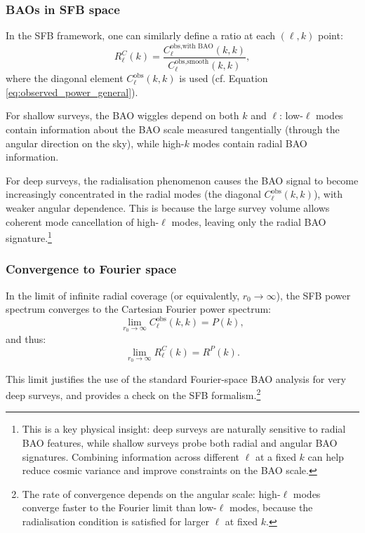 \subsubsection{BAOs in SFB space}

In the SFB framework, one can similarly define a ratio at each $(\ell,k)$ point:
\begin{equation}
R^C_\ell(k) = \frac{C^{\text{obs,with BAO}}_\ell(k,k)}{C^{\text{obs,smooth}}_\ell(k,k)},
\label{eq:bao_ratio_sfb}
\end{equation}
where the diagonal element $C^{\text{obs}}_\ell(k,k)$ is used (cf. Equation \ref{eq:observed_power_general}).

For shallow surveys, the BAO wiggles depend on both $k$ and $\ell$: low-$\ell$ modes contain information about
the BAO scale measured tangentially (through the angular direction on the sky), while high-$k$ modes contain
radial BAO information.

For deep surveys, the radialisation phenomenon causes the BAO signal to become increasingly concentrated in the
radial modes (the diagonal $C^{\text{obs}}_\ell(k,k)$), with weaker angular dependence. This is because the large
survey volume allows coherent mode cancellation of high-$\ell$ modes, leaving only the radial BAO signature.\footnote{This
is a key physical insight: deep surveys are naturally sensitive to radial BAO features, while shallow surveys probe
both radial and angular BAO signatures. Combining information across different $\ell$ at a fixed $k$ can help reduce
cosmic variance and improve constraints on the BAO scale.}

\subsubsection{Convergence to Fourier space}

In the limit of infinite radial coverage (or equivalently, $r_0\to\infty$), the SFB power spectrum converges to
the Cartesian Fourier power spectrum:
\begin{equation}
\lim_{r_0\to\infty} C^{\text{obs}}_\ell(k,k) = P(k),
\label{eq:convergence_fourier}
\end{equation}
and thus:
\begin{equation}
\lim_{r_0\to\infty} R^C_\ell(k) = R^P(k).
\label{eq:convergence_bao_ratio}
\end{equation}

This limit justifies the use of the standard Fourier-space BAO analysis for very deep surveys, and provides a check
on the SFB formalism.\footnote{The rate of convergence depends on the angular scale: high-$\ell$ modes converge
faster to the Fourier limit than low-$\ell$ modes, because the radialisation condition is satisfied for larger $\ell$
at fixed $k$.}

